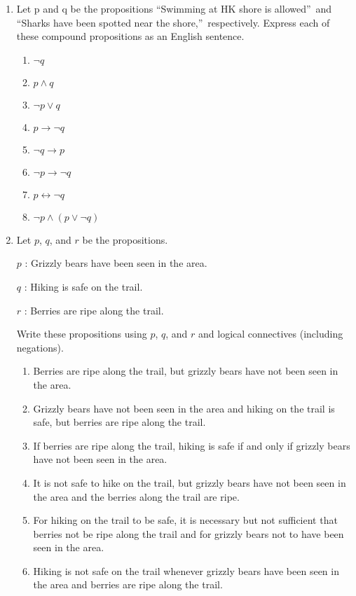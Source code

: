 \documentclass{sig-alternate-05-2015}
\begin{document}
\begin{enumerate}
\item Let p and q be the propositions \textquotedblleft Swimming at HK shore is allowed\textquotedblright\ and \textquotedblleft Sharks have been spotted
near the shore,\textquotedblright\ respectively. Express each of these compound
propositions as an English sentence.
\begin{enumerate}
	\item $\neg q$
	\item $p \wedge q$
	\item $\neg p \vee q$
	\item $p \rightarrow \neg q$
	\item $\neg q \rightarrow p$
	\item $\neg p \rightarrow \neg q$
	\item $p \leftrightarrow \neg q$
	\item $\neg p \wedge (p \vee \neg q)$
\end{enumerate}

\item Let $p$, $q$, and $r$ be the propositions.

$p$ : Grizzly bears have been seen in the area.

$q$ : Hiking is safe on the trail.

$r$ : Berries are ripe along the trail.

Write these propositions using $p$, $q$, and $r$ and logical
connectives (including negations).
\begin{enumerate}
\item Berries are ripe along the trail, but grizzly bears have
not been seen in the area.
\item Grizzly bears have not been seen in the area and hiking
on the trail is safe, but berries are ripe along the
trail.
\item If berries are ripe along the trail, hiking is safe if and
only if grizzly bears have not been seen in the area.
\item It is not safe to hike on the trail, but grizzly bears have
not been seen in the area and the berries along the trail
are ripe.
\item For hiking on the trail to be safe, it is necessary but not
sufficient that berries not be ripe along the trail and
for grizzly bears not to have been seen in the area.
\item Hiking is not safe on the trail whenever grizzly bears
have been seen in the area and berries are ripe along
the trail.
\end{enumerate}


\end{enumerate}
\end{document}
